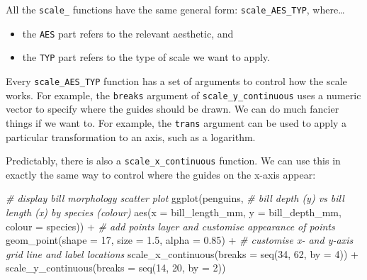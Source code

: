 \documentclass[
]{book}
\newenvironment{Shaded}{\begin{snugshade}}{\end{snugshade}}
\newcommand{\AttributeTok}[1]{\textcolor[rgb]{0.77,0.63,0.00}{#1}}
\newcommand{\CommentTok}[1]{\textcolor[rgb]{0.56,0.35,0.01}{\textit{#1}}}
\newcommand{\DecValTok}[1]{\textcolor[rgb]{0.00,0.00,0.81}{#1}}
\newcommand{\FloatTok}[1]{\textcolor[rgb]{0.00,0.00,0.81}{#1}}
\newcommand{\FunctionTok}[1]{\textcolor[rgb]{0.00,0.00,0.00}{#1}}
\newcommand{\NormalTok}[1]{#1}
\newcommand{\SpecialCharTok}[1]{\textcolor[rgb]{0.00,0.00,0.00}{#1}}
\providecommand{\tightlist}{%
  \setlength{\itemsep}{0pt}\setlength{\parskip}{0pt}}
\begin{document}
All the \texttt{scale\_} functions have the same general form: \texttt{scale\_AES\_TYP}, where\ldots{}

\begin{itemize}
\tightlist
\item
  the \texttt{AES} part refers to the relevant aesthetic, and
\item
  the \texttt{TYP} part refers to the type of scale we want to apply.
\end{itemize}

Every \texttt{scale\_AES\_TYP} function has a set of arguments to control how the scale works. For example, the \texttt{breaks} argument of \texttt{scale\_y\_continuous} uses a numeric vector to specify where the guides should be drawn. We can do much fancier things if we want to. For example, the \texttt{trans} argument can be used to apply a particular transformation to an axis, such as a logarithm.

Predictably, there is also a \texttt{scale\_x\_continuous} function. We can use this in exactly the same way to control where the guides on the x-axis appear:

\begin{Shaded}
\begin{Highlighting}[]
\CommentTok{\# display bill morphology scatter plot}
\FunctionTok{ggplot}\NormalTok{(penguins, }
       \CommentTok{\# bill depth (y) vs bill length (x) by species (colour)}
       \FunctionTok{aes}\NormalTok{(}\AttributeTok{x =}\NormalTok{ bill\_length\_mm, }\AttributeTok{y =}\NormalTok{ bill\_depth\_mm, }\AttributeTok{colour =}\NormalTok{ species)) }\SpecialCharTok{+} 
  \CommentTok{\# add points layer and customise appearance of points}
  \FunctionTok{geom\_point}\NormalTok{(}\AttributeTok{shape =} \DecValTok{17}\NormalTok{, }\AttributeTok{size =} \FloatTok{1.5}\NormalTok{, }\AttributeTok{alpha =} \FloatTok{0.85}\NormalTok{) }\SpecialCharTok{+} 
  \CommentTok{\# customise x{-} and y{-}axis grid line and label locations}
  \FunctionTok{scale\_x\_continuous}\NormalTok{(}\AttributeTok{breaks =} \FunctionTok{seq}\NormalTok{(}\DecValTok{34}\NormalTok{, }\DecValTok{62}\NormalTok{, }\AttributeTok{by =} \DecValTok{4}\NormalTok{)) }\SpecialCharTok{+}
  \FunctionTok{scale\_y\_continuous}\NormalTok{(}\AttributeTok{breaks =} \FunctionTok{seq}\NormalTok{(}\DecValTok{14}\NormalTok{, }\DecValTok{20}\NormalTok{, }\AttributeTok{by =} \DecValTok{2}\NormalTok{))}
\end{Highlighting}
\end{Shaded}
\end{document}
